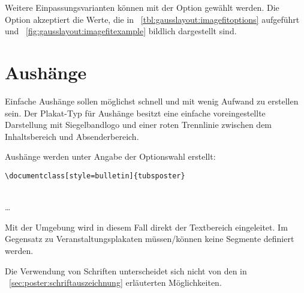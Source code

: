 Weitere Einpassungsvarianten können mit der Option 
gewählt werden.
Die Option  akzeptiert die Werte, die in
\tablename~\ref{tbl:gausslayout:imagefitoptions} aufgeführt und
\figurename~\ref{fig:gausslayout:imagefitexample} bildlich dargestellt sind.

\clearpage
\section{Aushänge}

Einfache Aushänge sollen möglichst schnell und mit wenig Aufwand zu erstellen sein.
Der Plakat-Typ für Aushänge besitzt eine einfache voreingestellte Darstellung
mit Siegelbandlogo und einer roten Trennlinie zwischen dem Inhaltsbereich
und Absenderbereich.

Aushänge werden unter Angabe der Optionswahl
 erstellt:
\begin{lstlisting}
\documentclass[style=bulletin]{tubsposter}
\end{lstlisting}

\begin{Declaration}
  \\
  \quad\dots\\
\end{Declaration}

Mit der Umgebung  wird in diesem Fall direkt
der Textbereich eingeleitet.
Im Gegensatz zu Veranstaltungsplakaten müssen/können keine Segmente 
definiert werden.

Die Verwendung von Schriften unterscheidet sich nicht von den in
\chaptername~\ref{sec:poster:schriftauszeichnung} erläuterten 
Möglichkeiten.

